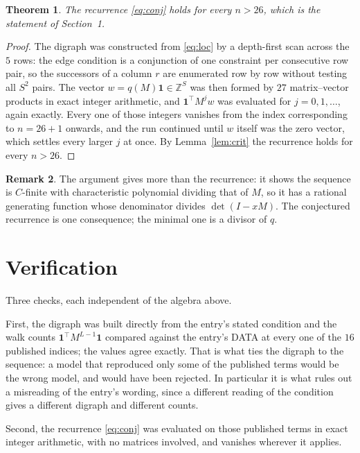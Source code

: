 \documentclass[11pt,a4paper]{article}
\theoremstyle{plain}
\newtheorem{theorem}{Theorem}
\theoremstyle{definition}
\newtheorem{remark}[theorem]{Remark}
\begin{document}
\begin{theorem}
The recurrence \eqref{eq:conj} holds for every $n>26$, which is the statement of
Section~1.
\end{theorem}

\begin{proof}
The digraph was constructed from \eqref{eq:loc} by a depth-first scan across the $5$
rows: the edge condition is a conjunction of one constraint per consecutive row
pair, so the successors of a column $r$ are enumerated row by row without testing all
$S^2$ pairs. The vector $w=q(M)\mathbf{1}\in\mathbb{Z}^{S}$ was then formed by $27$
matrix--vector products in exact integer arithmetic, and $\mathbf{1}^{\!\top}M^{j}w$ was
evaluated for $j=0,1,\dots$, again exactly. Every one of those integers vanishes from the
index corresponding to $n=26+1$ onwards, and the run continued until $w$ itself was the
zero vector, which settles every larger $j$ at once. By Lemma~\ref{lem:crit} the recurrence
holds for every $n>26$.
\end{proof}

\begin{remark}
The argument gives more than the recurrence: it shows the sequence is $C$-finite with
characteristic polynomial dividing that of $M$, so it has a rational generating function
whose denominator divides $\det(I-xM)$. The conjectured recurrence is one consequence; the
minimal one is a divisor of $q$.
\end{remark}

\section{Verification}

Three checks, each independent of the algebra above.

First, the digraph was built directly from the entry's stated condition and the walk counts
$\mathbf{1}^{\!\top}M^{L-1}\mathbf{1}$ compared against the entry's DATA at
every one of the $16$ published indices; the values agree exactly. That is what ties
the digraph to the sequence: a model that reproduced only some of the published terms would
be the wrong model, and would have been rejected. In particular it is what rules out a
misreading of the entry's wording, since a different reading of the condition gives a
different digraph and different counts.

Second, the recurrence \eqref{eq:conj} was evaluated on those published terms in exact
integer arithmetic, with no matrices involved, and vanishes wherever it applies.
\end{document}
